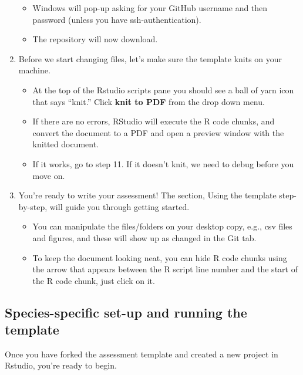 \documentclass[12pt,]{article}
\providecommand{\tightlist}{%
  \setlength{\itemsep}{0pt}\setlength{\parskip}{0pt}}
\begin{document}
\begin{enumerate}
  \begin{itemize}
  \tightlist
  \item
    Windows will pop-up asking for your GitHub username and then
    password (unless you have ssh-authentication).
  \item
    The repository will now download.
  \end{itemize}
\item
  Before we start changing files, let's make sure the template knits on
  your machine.

  \begin{itemize}
  \tightlist
  \item
    At the top of the Rstudio scripts pane you should see a ball of yarn
    icon that says ``knit.'' Click \textbf{knit to PDF} from the drop
    down menu.
  \item
    If there are no errors, RStudio will execute the R code chunks, and
    convert the document to a PDF and open a preview window with the
    knitted document.
  \item
    If it works, go to step 11. If it doesn't knit, we need to debug
    before you move on.
  \end{itemize}
\item
  You're ready to write your assessment! The section, Using the template
  step-by-step, will guide you through getting started.

  \begin{itemize}
  \tightlist
  \item
    You can manipulate the files/folders on your desktop copy, e.g., csv
    files and figures, and these will show up as changed in the Git tab.
  \item
    To keep the document looking neat, you can hide R code chunks using
    the arrow that appears between the R script line number and the
    start of the R code chunk, just click on it.
  \end{itemize}
\end{enumerate}

\subsection{Species-specific set-up and running the
template}\label{species-specific-set-up-and-running-the-template}

Once you have forked the assessment template and created a new project
in Rstudio, you're ready to begin.
\end{document}
